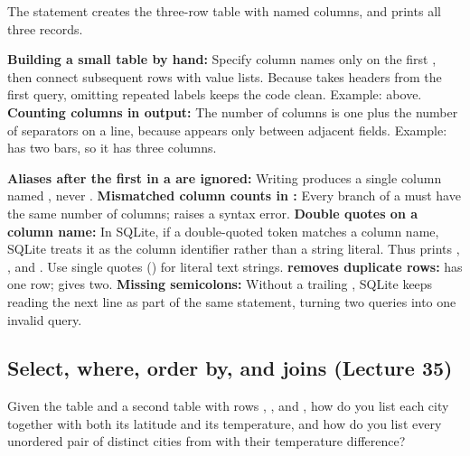 \documentclass[10pt]{scrartcl}
\begin{document}
\revisit The  statement creates the three-row table with named columns, and  prints all three records.

\begin{shortcuts}
  \ii \textbf{Building a small table by hand:} Specify  column names only on the first , then connect subsequent rows with  value lists. Because  takes headers from the first query, omitting repeated  labels keeps the code clean. Example:  above.
  \ii \textbf{Counting columns in output:} The number of columns is one plus the number of \cd{|} separators on a line, because \cd{|} appears only between adjacent fields. Example:  has two bars, so it has three columns.
\end{shortcuts}

\begin{trapbox}
  \ii \textbf{Aliases after the first  in a  are ignored:} Writing  produces a single column named , never .
  \ii \textbf{Mismatched column counts in :} Every branch of a  must have the same number of columns;  raises a syntax error.
  \ii \textbf{Double quotes on a column name:} In SQLite, if a double-quoted token matches a column name, SQLite treats it as the column identifier rather than a string literal. Thus  prints , , and . Use single quotes () for literal text strings.
  \ii \textbf{ removes duplicate rows:}  has one row;  gives two.
  \ii \textbf{Missing semicolons:} Without a trailing \cd{;}, SQLite keeps reading the next line as part of the same statement, turning two queries into one invalid query.
\end{trapbox}

\subsection{Select, where, order by, and joins (Lecture 35)}

\begin{qbox}
  Given the  table and a second table  with rows , , and , how do you list each city together with both its latitude and its temperature, and how do you list every unordered pair of distinct cities from  with their temperature difference?
\end{qbox}
\end{document}
